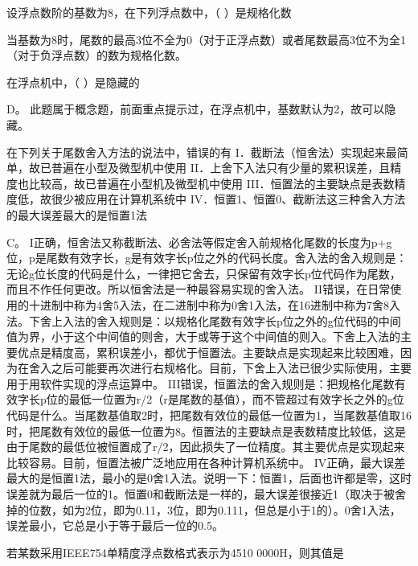 \question 设浮点数阶的基数为8，在下列浮点数中，（ ）是规格化数
\par{}
\begin{solution}当基数为8时，尾数的最高3位不全为0（对于正浮点数）或者尾数最高3位不为全1（对于负浮点数）的数为规格化数。
\end{solution}
\question 在浮点机中，（ ）是隐藏的
\par{}
\begin{solution}D。
此题属于概念题，前面重点提示过，在浮点机中，基数默认为2，故可以隐藏。
\end{solution}
\question 在下列关于尾数舍入方法的说法中，错误的有
I．截断法（恒舍法）实现起来最简单，故已普遍在小型及微型机中使用
II．上舍下入法只有少量的累积误差，且精度也比较高，故已普遍在小型机及微型机中使用
III．恒置法的主要缺点是表数精度低，故很少被应用在计算机系统中
IV．恒置1、恒置0、截断法这三种舍入方法的最大误差最大的是恒置1法
\par{}
\begin{solution}C。
I正确，恒舍法又称截断法、必舍法等假定舍入前规格化尾数的长度为p+g位，p是尾数有效字长，g是有效字长p位之外的代码长度。舍入法的舍入规则是：无论g位长度的代码是什么，一律把它舍去，只保留有效字长p位代码作为尾数，而且不作任何更改。所以恒舍法是一种最容易实现的舍入法。
II错误，在日常使用的十进制中称为4舍5入法，在二进制中称为0舍1入法，在16进制中称为7舍8入法。下舍上入法的舍入规则是：以规格化尾数有效字长p位之外的g位代码的中间值为界，小于这个中间值的则舍，大于或等于这个中间值的则入。下舍上入法的主要优点是精度高，累积误差小，都优于恒置法。主要缺点是实现起来比较困难，因为在舍入之后可能要再次进行右规格化。目前，下舍上入法已很少实际使用，主要用于用软件实现的浮点运算中。
III错误，恒置法的舍入规则是：把规格化尾数有效字长p位的最低一位置为r/2（r是尾数的基值），而不管超过有效字长之外的g位代码是什么。当尾数基值取2时，把尾数有效位的最低一位置为1，当尾数基值取16时，把尾数有效位的最低一位置为8。恒置法的主要缺点是表数精度比较低，这是由于尾数的最低位被恒置成了r/2，因此损失了一位精度。其主要优点是实现起来比较容易。目前，恒置法被广泛地应用在各种计算机系统中。
IV正确，最大误差最大的是恒置1法，最小的是0舍1入法。说明一下：恒置1，后面也许都是零，这时误差就为最后一位的1。恒置0和截断法是一样的，最大误差很接近1（取决于被舍掉的位数，如为2位，即为0.11，3位，即为0.111，但总是小于1的）。0舍1入法，误差最小，它总是小于等于最后一位的0.5。
\end{solution}
\question 若某数采用IEEE754单精度浮点数格式表示为4510 0000H，则其值是
